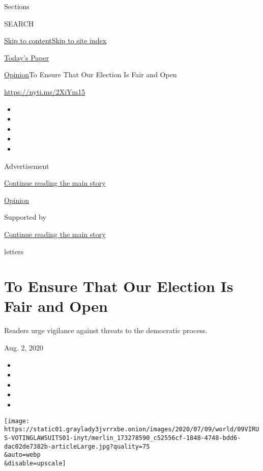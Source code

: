 Sections

SEARCH

\protect\hyperlink{site-content}{Skip to
content}\protect\hyperlink{site-index}{Skip to site index}

\href{https://myaccount.nytimes3xbfgragh.onion/auth/login?response_type=cookie\&client_id=vi}{}

\href{https://www.nytimes3xbfgragh.onion/section/todayspaper}{Today's
Paper}

\href{/section/opinion}{Opinion}\textbar{}To Ensure That Our Election Is
Fair and Open

\url{https://nyti.ms/2XiYm15}

\begin{itemize}
\item
\item
\item
\item
\item
\end{itemize}

Advertisement

\protect\hyperlink{after-top}{Continue reading the main story}

\href{/section/opinion}{Opinion}

Supported by

\protect\hyperlink{after-sponsor}{Continue reading the main story}

letters

\hypertarget{to-ensure-that-our-election-is-fair-and-open}{%
\section{To Ensure That Our Election Is Fair and
Open}\label{to-ensure-that-our-election-is-fair-and-open}}

Readers urge vigilance against threats to the democratic process.

Aug. 2, 2020

\begin{itemize}
\item
\item
\item
\item
\item
\end{itemize}

\texttt{[image: https://static01.graylady3jvrrxbe.onion/images/2020/07/09/world/09VIRUS-VOTINGLAWSUITS01-inyt/merlin\_173278590\_c52556cf-1848-4748-bdd6-dac02de7382b-articleLarge.jpg?quality=75\\\&auto=webp\\\&disable=upscale]}

